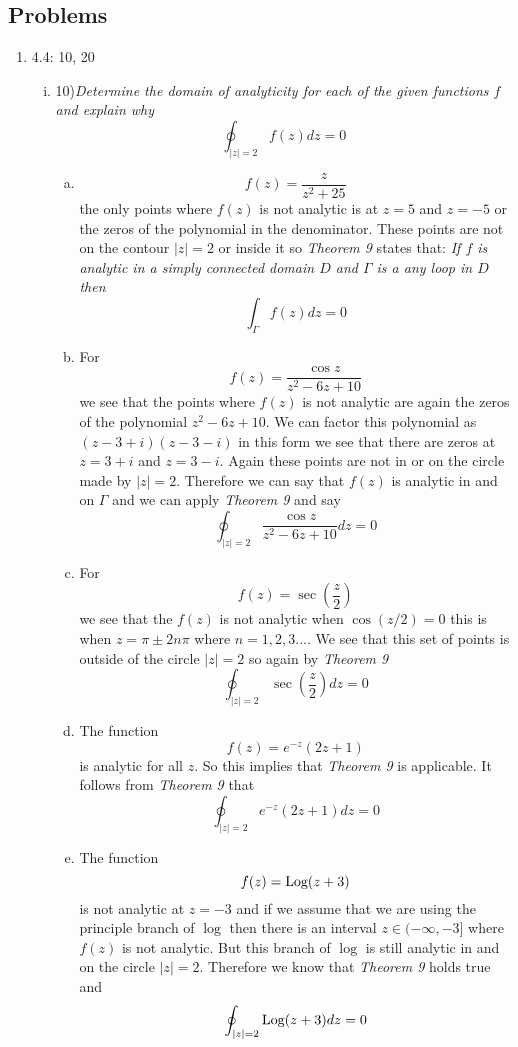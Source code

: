 \documentclass[11pt]{article}
\newcommand{\Log}{\textnormal{Log}}
\begin{document}
\subsection*{Problems}
\begin{enumerate}

\item 4.4: 10, 20
\begin{enumerate}[(i)]
\item 10)\textit{Determine the domain of analyticity for each of the given functions $f$ and explain why}
$$\oint_{|z|=2}f(z)dz=0$$
\begin{enumerate}[(a)]
\item 
$$f(z) = \frac{z}{z^2+25}$$
the only points where $f(z)$ is not analytic is at $z=5$ and $z=-5$ or the zeros of the polynomial in the denominator. These points are not on the contour $|z|=2$ or inside it so \emph{Theorem 9} states that: \textit{If $f$ is analytic in a simply connected domain $D$ and $\Gamma$ is a any loop in $D$ then}
$$\int_{\Gamma}f(z)dz = 0$$

\item 
For
$$f(z) = \frac{\cos z}{z^2-6z+10}$$
we see that the points where $f(z)$ is not analytic are again the zeros of the polynomial $z^2-6z+10$. We can factor this polynomial as $(z-3+i)(z-3-i)$ in this form we see that there are zeros at $z=3+i$ and $z=3-i$. Again these points are not in or on the circle made by $|z|=2$. Therefore we can say that $f(z)$ is analytic in and on $\Gamma$ and we can apply \emph{Theorem 9} and say
$$\oint_{|z|=2}\frac{\cos z}{z^2-6z+10}dz=0$$
\item 
For $$f(z) = \sec\left(\frac{z}{2}\right)$$
we see that the $f(z)$ is not analytic when $\cos(z/2)=0$ this is when $z=\pi\pm2n\pi$ where $n=1,2,3...$. We see that this set of points is outside of the circle $|z|=2$ so again by \emph{Theorem 9} 
$$\oint_{|z|=2}\sec\left(\frac{z}{2}\right) dz=0$$

\item  The function $$f(z) = e^{-z}(2z+1)$$
is analytic for all $z$. So this implies that \emph{Theorem 9} is applicable. It follows from \emph{Theorem 9} that
$$\oint_{|z|=2}e^{-z}(2z+1)dz=0$$

\item The function $$f(z) = \Log(z+3)$$ is not analytic at $z=-3$ and if we assume that we are using the principle branch of $\log$ then there is an interval $z\in(-\infty,-3]$ where $f(z)$ is not analytic. But this branch of $\log$ is still analytic in and on the circle $|z|=2$. Therefore we know that \emph{Theorem 9} holds true and 
$$\oint_{|z|=2}\Log(z+3)dz=0$$
\end{enumerate}


\end{enumerate}
\end{enumerate}
\end{document}
